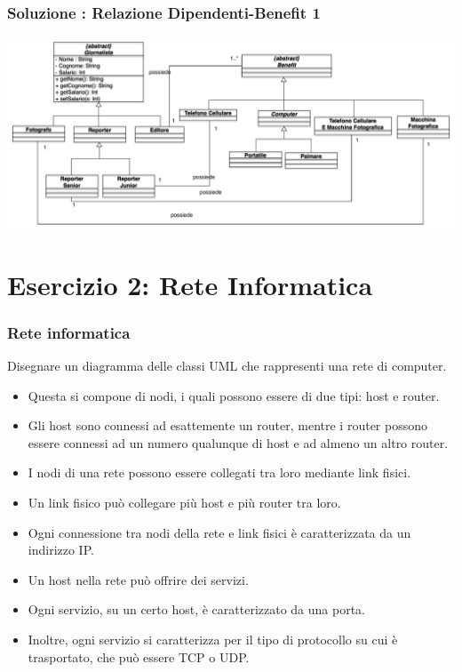\documentclass{beamer}
\begin{document}
\begin{frame}
\frametitle{Soluzione : Relazione Dipendenti-Benefit 1}
\includegraphics[scale=0.27]{Img/impiegatobenefit.pdf}
\end{frame}



\section{Esercizio 2: Rete Informatica}
\begin{frame}
\frametitle{Rete informatica}
Disegnare un diagramma delle classi UML che rappresenti una rete di computer.
\begin{itemize}
\item Questa si compone di nodi, i quali possono essere di due tipi: host e router.
\item Gli host sono connessi ad esattemente un router, mentre i router possono essere connessi ad un numero qualunque di host e ad almeno un altro router.
\item I nodi di una rete possono essere collegati tra loro mediante link fisici.
\item Un link fisico pu\`o collegare pi\`u host e pi\`u router tra loro.
\item Ogni connessione tra nodi della rete e link fisici è caratterizzata
da un indirizzo IP.
\item Un host nella rete pu\`o offrire dei servizi.
\item Ogni servizio, su un certo host, \`e caratterizzato da una porta.
\item Inoltre, ogni servizio si caratterizza per il tipo di protocollo su cui \`e trasportato, che pu\`o essere TCP o UDP.
\end{itemize} 
\end{frame}
\end{document}
